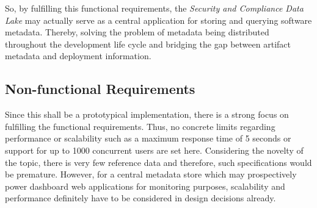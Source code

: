 So, by fulfilling this functional requirements, the \emph{Security and Compliance Data Lake} may actually serve as a central application for storing and querying software metadata. Thereby, solving the problem of metadata being distributed throughout the development life cycle and bridging the gap between artifact metadata and deployment information.

\subsection{Non-functional Requirements} \label{sec:Non-functional Requirements}
Since this shall be a prototypical implementation, there is a strong focus on fulfilling the functional requirements. Thus, no concrete limits regarding performance or scalability such as a maximum response time of 5 seconds or support for up to 1000 concurrent users are set here. Considering the novelty of the topic, there is very few reference data and therefore, such specifications would be premature. However, for a central metadata store which may prospectively power dashboard web applications for monitoring purposes, scalability and performance definitely have to be considered in design decisions already.


